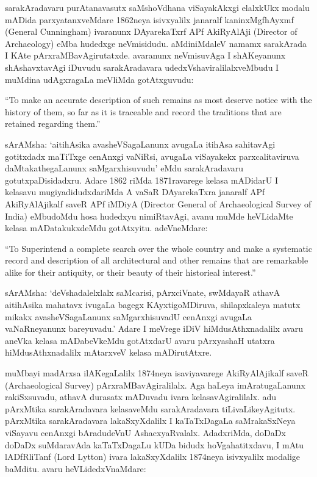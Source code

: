 \documentclass[11pt,a4size]{article}
\begin{document}
sarakAradavaru purAtanavasutx saMshoVdhana viSayakAkxgi elalxkUkx
modalu mADida parxyatanxveMdare 1862neya isivxyalilx janaralf
kaninxMgfhAyxmf {\rm (General Cunningham)} ivaranunx
DAyarekaTxrf APf AkiRyAlAji {\rm (Director of
    Archaeology)} eMba hudedxge neVmisidudu. aMdiniMdaleV namamx
sarakArada I KAte pArxraMBavAgirutatxde. avaranunx neVmisuvAga I
shAKeyanunx shAshavxtavAgi iDuvudu sarakAradavara
udedxVshaviralilalxveMbudu I muMdina udAgxragaLa meVliMda
gotAtxguvudu:

{
\rm
``To make an accurate description of such remains as most deserve
notice with the history of them, so far as it is traceable and record
the traditions that are retained regarding them.''}

sArAMsha: `aitihAsika avasheVSagaLanunx avugaLa itihAsa sahitavAgi
gotitxdadx maTiTxge cenAnxgi vaNiRsi, avugaLa viSayakekx
parxcalitaviruva daMtakathegaLanunx saMgarxhisuvudu' eMdu
sarakAradavaru gotutxpaDisidadxru. Adare 1862 riMda 1871ravarege
kelasa mADidarU I kelasavu mugiyadidudxdariMda A vaSaR DAyarekaTxra
janaralf APf AkiRyAlAjikalf saveR APf iMDiyA {\rm
    (Director General of Archaeological Survey of India)} eMbudoMdu
hosa hudedxyu nimiRtavAgi, avanu muMde heVLidaMte kelasa
mADatakukxdeMdu gotAtxyitu. adeVneMdare:

{
\rm
``To Superintend a complete search over the whole country and make a
systematic record and description of all architectural and other
remains that are remarkable alike for their antiquity, or their beauty
of their historieal interest.''}

sArAMsha: `deVshadalelxlalx saMcarisi, pArxciVnate, swMdayaR athavA
aitihAsika mahatavx ivugaLa bagegx KAyxtigoMDiruva, shilapxkaleya
matutx mikakx avasheVSagaLanunx saMgarxhisuvadU cenAnxgi avugaLa
vaNaRneyanunx bareyuvadu.' Adare I meVrege iDiV hiMdusAthxnadalilx
avaru aneVka kelasa mADabeVkeMdu gotAtxdarU avaru pArxyashaH utatxra
hiMdusAthxnadalilx mAtarxveV kelasa mADirutAtxre.

muMbayi madArxsa ilAKegaLalilx 1874neya isaviyavarege AkiRyAlAjikalf
saveR {\rm (Archaeological Survey)} pArxraMBavAgiralilalx. Aga haLeya imAratugaLanunx rakiSxsuvadu, athavA
durasatx mADuvadu ivara kelasavAgiralilalx. adu pArxMtika
sarakAradavara kelasaveMdu sarakAradavara
tiLivaLikeyAgitutx. pArxMtika sarakAradavara lakaSxyXdalilx I
kaTaTxDagaLa saMrakaSxNeya viSayavu cenAnxgi bAradudeVnU
AshacxyaRvalalx. AdadxriMda, doDaDx doDaDx suMdaravAda kaTaTxDagaLu
kUDa bidudx hoVgahatitxdavu, I mAtu lADfRliTanf {\rm
    (Lord Lytton)} ivara lakaSxyXdalilx 1874neya isivxyalilx modalige
baMditu. avaru heVLidedxVnaMdare:
\end{document}
